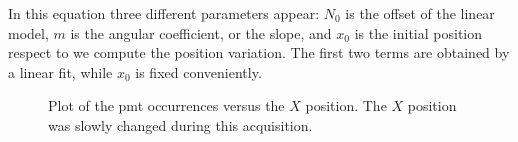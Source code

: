 In this equation three different parameters appear: $N_{0}$ is the offset of the linear model, $m$ is the angular coefficient, or the slope, and $x_{0}$ is the initial position respect to we compute the position variation. The first two terms are obtained by a linear fit, while $x_{0}$ is fixed conveniently.

\begin{figure}[hbtp]
\centering
{}
\caption{Plot of the pmt occurrences versus the $X$ position. The $X$ position was slowly changed during this acquisition.}
\label{fig:SlowPosition}
\end{figure}


